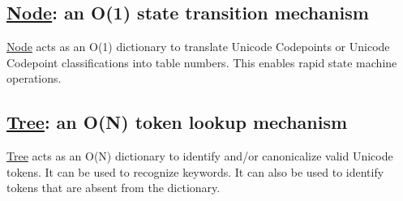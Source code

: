 \subsection*{\hyperlink{class_node}{Node}\+: an O(1) state transition mechanism}

\hyperlink{class_node}{Node} acts as an O(1) dictionary to translate Unicode Codepoints or Unicode Codepoint classifications into table numbers. This enables rapid state machine operations.

\subsection*{\hyperlink{class_tree}{Tree}\+: an O(\+N) token lookup mechanism}

\hyperlink{class_tree}{Tree} acts as an O(\+N) dictionary to identify and/or canonicalize valid Unicode tokens. It can be used to recognize keywords. It can also be used to identify tokens that are absent from the dictionary. 